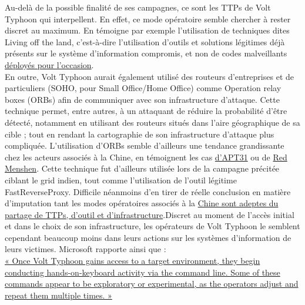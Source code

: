 \documentclass[a4paper]{article}
\begin{document}
Au-delà de la possible finalité de ses campagnes, ce sont les TTPs de Volt Typhoon qui interpellent. En effet, ce mode opératoire semble chercher à rester discret au maximum. En témoigne par exemple l’utilisation de techniques dites Living off the land, c’est-à-dire l’utilisation d’outils et solutions légitimes déjà présents sur le système d’information compromis, et non de codes malveillants  \href{https://www.microsoft.com/en-us/security/blog/2023/05/24/volt-typhoon-targets-us-critical-infrastructure-with-living-off-the-land-techniques/}{déployés pour l’occasion}. 
\\

En outre, Volt Typhoon aurait également utilisé des routeurs d’entreprises et de particuliers (SOHO, pour Small Office/Home Office) comme Operation relay boxes (ORBs) afin de communiquer avec son infrastructure d’attaque. Cette technique permet, entre autres, à un attaquant de réduire la probabilité d’être détecté, notamment en utilisant des routeurs situés dans l’aire géographique de sa cible ; tout en rendant la cartographie de son infrastructure d’attaque plus compliquée. L’utilisation d’ORBs semble d’ailleurs une tendance grandissante chez les acteurs associés à la Chine, en témoignent les cas \href{https://www.microsoft.com/en-us/security/blog/2023/05/24/volt-typhoon-targets-us-critical-infrastructure-with-living-off-the-land-techniques/}{d’APT31} ou de \href{https://www.recordedfuture.com/redecho-targeting-indian-power-sector}
{Red Menshen}. Cette technique fut d’ailleurs utilisée lors de la campagne précitée ciblant le grid indien, tout comme l’utilisation de l’outil légitime FastReverseProxy. Difficile néanmoins d’en tirer de réelle conclusion en matière d’imputation tant les modes opératoires associés à la \href{https://www.nytimes.com/2021/02/28/us/politics/china-india-hacking-electricity.html}{Chine sont adeptes du partage de TTPs, d’outil et d’infrastructure}.Discret au moment de l’accès initial et dans le choix de son infrastructure, les opérateurs de Volt Typhoon le semblent cependant beaucoup moins dans leurs actions sur les systèmes d’information de leurs victimes. Microsoft rapporte ainsi que :
\\

\href{https://www.recordedfuture.com/continued-targeting-of-indian-power-grid-assets}{« Once Volt Typhoon gains access to a target environment, they begin conducting hands-on-keyboard activity via the command line. Some of these commands appear to be exploratory or experimental, as the operators adjust and repeat them multiple times. »}
\\
\end{document}
